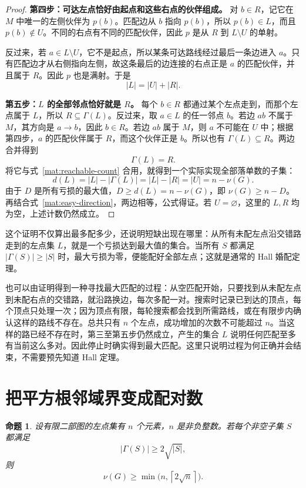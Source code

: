 \documentclass[UTF8,a4paper,oneside,openany,fontset=fandol,zihao=-4]{ctexbook}
\theoremstyle{guide}
\newtheorem{proposition}[theorem]{命题}
\newcommand{\ceil}[1]{\left\lceil#1\right\rceil}
\begin{document}
\begin{proof}
\textbf{第四步：可达左点恰好由起点和这些右点的伙伴组成。}
对 $b\in R$，记它在 $M$ 中唯一的左侧伙伴为 $p(b)$。匹配边从 $b$ 指向 $p(b)$，所以 $p(b)\in L$，而且 $p(b)\notin U$。不同的右点有不同的匹配伙伴，因此 $p$ 是从 $R$ 到 $L\setminus U$ 的单射。

反过来，若 $a\in L\setminus U$，它不是起点，所以某条可达路线经过最后一条边进入 $a$。只有匹配边才从右侧指向左侧，故这条最后的边连接的右点正是 $a$ 的匹配伙伴，并且属于 $R$。因此 $p$ 也是满射。于是
\begin{equation}\label{mat:reachable-count}
|L|=|U|+|R|.
\end{equation}

\textbf{第五步：$L$ 的全部邻点恰好就是 $R$。}
每个 $b\in R$ 都通过某个左点走到，而那个左点属于 $L$，所以 $R\subseteq\Gamma(L)$。反过来，取 $a\in L$ 的任一邻点 $b$。若边 $ab$ 不属于 $M$，其方向是 $a\to b$，因此 $b\in R$。若边 $ab$ 属于 $M$，则 $a$ 不可能在 $U$ 中；根据第四步，$a$ 的匹配伙伴属于 $R$，而这个伙伴正是 $b$。所以也有 $\Gamma(L)\subseteq R$。两边合并得到
\[
\Gamma(L)=R.
\]
将它与式~\eqref{mat:reachable-count} 合用，就得到一个实际实现全部落单数的子集：
\[
d(L)=|L|-|\Gamma(L)|=|L|-|R|=|U|=n-\nu(G).
\]
由于 $D$ 是所有亏损的最大值，$D\geq d(L)=n-\nu(G)$，即 $\nu(G)\geq n-D$。再结合式~\eqref{mat:easy-direction}，两边相等，公式得证。若 $U=\varnothing$，这里的 $L,R$ 均为空，上述计数仍然成立。
\end{proof}

这个证明不仅算出最多配多少，还说明短缺出现在哪里：从所有未配左点沿交错路走到的左点集 $L$，就是一个亏损达到最大值的集合。当所有 $S$ 都满足 $|\Gamma(S)|\geq|S|$ 时，最大亏损为零，便能配好全部左点；这就是通常的 Hall 婚配定理。

也可以由证明得到一种寻找最大匹配的过程：从空匹配开始，只要找到从未配左点到未配右点的交错路，就沿路换边，每次多配一对。搜索时记录已到达的顶点，每个顶点只处理一次；因为顶点有限，每轮搜索都会找到所需路线，或在有限步内确认这样的路线不存在。总共只有 $n$ 个左点，成功增加的次数不可能超过 $n$。当这样的路已经不存在时，第三至第五步仍然成立，产生的集合 $L$ 说明任何匹配至多有当前这么多对。因此停止时确实得到最大匹配。这里只说明过程为何正确并会结束，不需要预先知道 Hall 定理。

\section{把平方根邻域界变成配对数}

\begin{proposition}\label{prop:neighbor-to-matching}
设有限二部图的左点集有 $n$ 个元素，$n$ 是非负整数。若每个非空子集 $S$ 都满足
\begin{equation}\label{mat:sqrt-neighborhood}
|\Gamma(S)|\geq2\sqrt{|S|},
\end{equation}
则
\[
\nu(G)\geq\min\bigl(n,\ceil{2\sqrt n}\bigr).
\]
\end{proposition}
\end{document}
